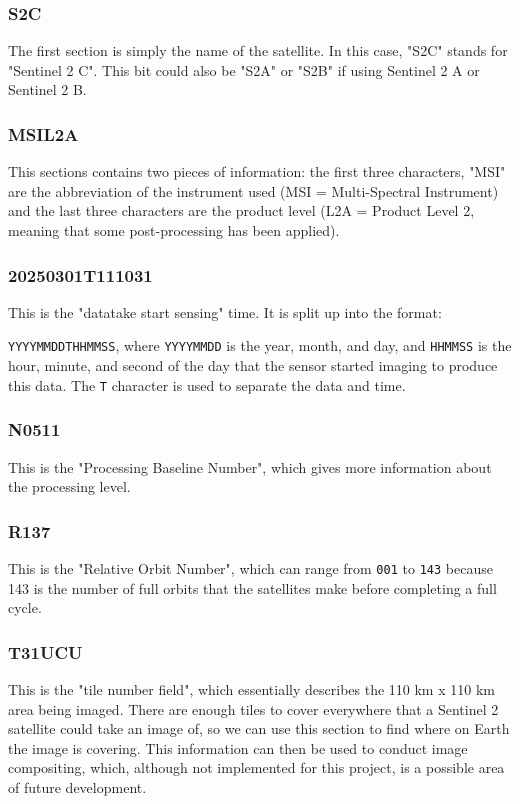 \subsubsection{S2C}
The first section is simply the name of the satellite. In this case, "S2C" stands for "Sentinel 2 C". This bit could also be "S2A" or "S2B" if using Sentinel 2 A or Sentinel 2 B. 

\subsubsection{MSIL2A}
This sections contains two pieces of information: the first three characters, "MSI" are the abbreviation of the instrument used (MSI = Multi-Spectral Instrument) and the last three characters are the product level (L2A = Product Level 2, meaning that some post-processing has been applied). 

\subsubsection{20250301T111031}
This is the "datatake start sensing" time. It is split up into the format: 

\verb|YYYYMMDDTHHMMSS|, where \verb|YYYYMMDD| is the year, month, and day, and \verb|HHMMSS| is the hour, minute, and second of the day that the sensor started imaging to produce this data. The \verb|T| character is used to separate the data and time. 

\subsubsection{N0511}
This is the "Processing Baseline Number", which gives more information about the processing level. 

\subsubsection{R137}
This is the "Relative Orbit Number", which can range from \verb|001| to \verb|143| because 143 is the number of full orbits that the satellites make before completing a full cycle. 

\subsubsection{T31UCU}
This is the "tile number field", which essentially describes the 110 km x 110 km area being imaged. There are enough tiles to cover everywhere that a Sentinel 2 satellite could take an image of, so we can use this section to find where on Earth the image is covering. This information can then be used to conduct image compositing, which, although not implemented for this project, is a possible area of future development. 

